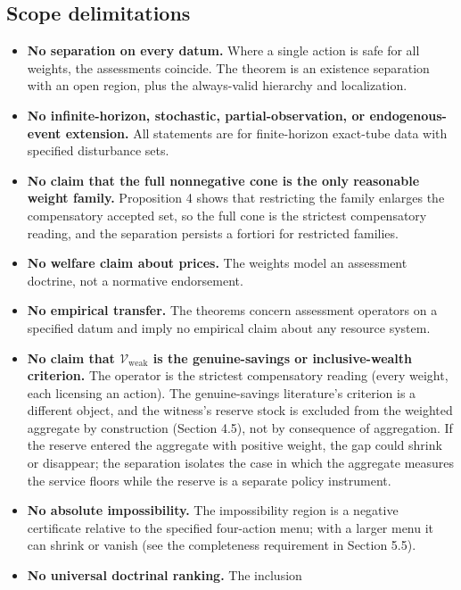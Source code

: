 \documentclass[review,11pt]{elsarticle}
\providecommand{\tightlist}{\setlength{\itemsep}{0pt}\setlength{\parskip}{0pt}}
\begin{document}
\subsection{Scope delimitations}\label{scope-delimitations}

\begin{itemize}
\tightlist
\item
  \textbf{No separation on every datum.} Where a single action is safe
  for all weights, the assessments coincide. The theorem is an existence
  separation with an open region, plus the always-valid hierarchy and
  localization.
\item
  \textbf{No infinite-horizon, stochastic, partial-observation, or
  endogenous-event extension.} All statements are for finite-horizon exact-tube data with specified disturbance sets.
\item
  \textbf{No claim that the full nonnegative cone is the only reasonable
  weight family.} Proposition 4 shows that restricting the family
  enlarges the compensatory accepted set, so the full cone is the strictest compensatory reading, and the separation persists a fortiori for restricted families.
\item
  \textbf{No welfare claim about prices.} The weights model an
  assessment doctrine, not a normative endorsement.
\item
  \textbf{No empirical transfer.} The theorems concern assessment operators on a specified datum and imply no empirical claim about any resource system.
\item
  \textbf{No claim that \(\mathcal{V}_{\mathrm{weak}}\) is the
  genuine-savings or inclusive-wealth criterion.} The operator is the
  strictest compensatory reading (every weight, each licensing an
  action). The genuine-savings literature's criterion is a different
  object, and the witness's reserve stock is excluded from the weighted aggregate by construction (Section 4.5), not by consequence of aggregation. If the reserve entered the aggregate with positive weight, the gap could shrink or disappear; the separation isolates the case in which the aggregate measures the service floors while the reserve is a separate policy instrument.
\item
  \textbf{No absolute impossibility.} The impossibility region is a negative certificate relative to the specified four-action menu; with a larger menu it can shrink or vanish (see the completeness requirement in Section 5.5).
\item
  \textbf{No universal doctrinal ranking.} The inclusion

\end{itemize}
\end{document}
